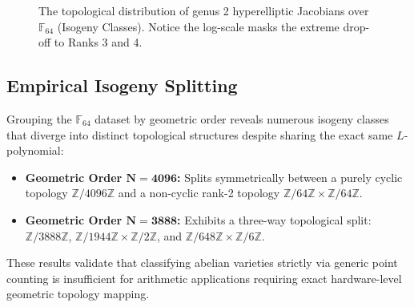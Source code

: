 \documentclass[11pt,letterpaper]{article}
\begin{document}
\begin{figure}[htpb]
\centering
{}
\caption{The topological distribution of genus 2 hyperelliptic Jacobians over $\mathbb{F}_{64}$ (Isogeny Classes). Notice the log-scale masks the extreme drop-off to Ranks 3 and 4.}
\label{fig:rank_distribution}
\end{figure}

\subsection{Empirical Isogeny Splitting}
Grouping the $\mathbb{F}_{64}$ dataset by geometric order reveals numerous isogeny classes that diverge into distinct topological structures despite sharing the exact same $L$-polynomial:
\begin{itemize}
\item \textbf{Geometric Order $\mathbf{N=4096}$:} Splits symmetrically between a purely cyclic topology $\mathbb{Z}/4096\mathbb{Z}$ and a non-cyclic rank-2 topology $\mathbb{Z}/64\mathbb{Z} \times \mathbb{Z}/64\mathbb{Z}$.
\item \textbf{Geometric Order $\mathbf{N=3888}$:} Exhibits a three-way topological split: $\mathbb{Z}/3888\mathbb{Z}$, $\mathbb{Z}/1944\mathbb{Z} \times \mathbb{Z}/2\mathbb{Z}$, and $\mathbb{Z}/648\mathbb{Z} \times \mathbb{Z}/6\mathbb{Z}$.
\end{itemize}
These results validate that classifying abelian varieties strictly via generic point counting is insufficient for arithmetic applications requiring exact hardware-level geometric topology mapping. 
\end{document}
